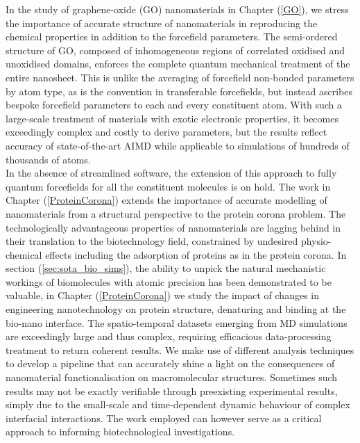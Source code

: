 In the study of graphene-oxide (GO) nanomaterials in Chapter (\ref{GO}), we stress the importance of accurate structure of nanomaterials in reproducing the chemical properties in addition to the forcefield parameters. The semi-ordered structure of GO, composed of inhomogeneous regions of correlated oxidised and unoxidised domains, enforces the complete quantum mechanical treatment of the entire nanosheet. This is unlike the averaging of forcefield non-bonded parameters by atom type, as is the convention in transferable forcefields, but instead ascribes bespoke forcefield parameters to each and every constituent atom. With such a large-scale treatment of materials with exotic electronic properties, it becomes exceedingly complex and costly to derive parameters, but the results reflect accuracy of state-of-the-art AIMD while applicable to simulations of hundreds of thousands of atoms. \\

In the absence of streamlined software, the extension of this approach to fully quantum forcefields for all the constituent molecules is on hold. The work in Chapter (\ref{ProteinCorona}) extends the importance of accurate modelling of nanomaterials from a structural perspective to the protein corona problem. The technologically advantageous properties of nanomaterials are lagging behind in their translation to the biotechnology field, constrained by undesired physio-chemical effects including the adsorption of proteins as in the protein corona. In section (\ref{sec:sota_bio_sims}), the ability to unpick the natural mechanistic workings of biomolecules with atomic precision has been demonstrated to be valuable, in Chapter (\ref{ProteinCorona}) we study the impact of changes in engineering nanotechnology on protein structure, denaturing and binding at the bio-nano interface. The spatio-temporal datasets emerging from MD simulations are exceedingly large and thus complex, requiring efficacious data-processing treatment to return coherent results. We make use of different analysis techniques to develop a pipeline that can accurately shine a light on the consequences of nanomaterial functionalisation on macromolecular structures. Sometimes such results may not be exactly verifiable through preexisting experimental results, simply due to the small-scale and time-dependent dynamic behaviour of complex interfacial interactions. The work employed can however serve as a critical approach to informing biotechnological investigations. \\

